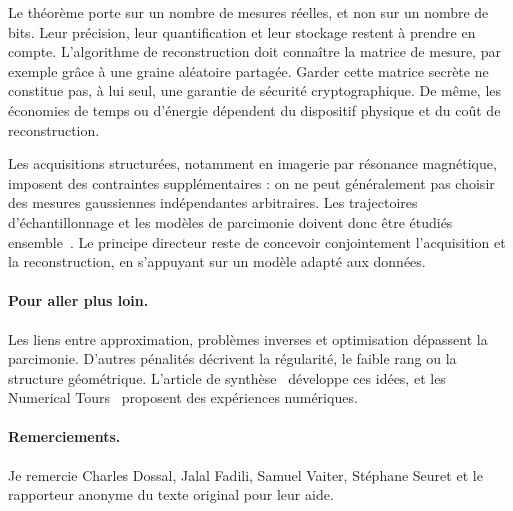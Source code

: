 Le théorème porte sur un nombre de mesures réelles, et non sur un nombre de bits. Leur précision, leur quantification et leur stockage restent à prendre en compte. L'algorithme de reconstruction doit connaître la matrice de mesure, par exemple grâce à une graine aléatoire partagée. Garder cette matrice secrète ne constitue pas, à lui seul, une garantie de sécurité cryptographique. De même, les économies de temps ou d'énergie dépendent du dispositif physique et du coût de reconstruction.

Les acquisitions structurées, notamment en imagerie par résonance magnétique, imposent des contraintes supplémentaires : on ne peut généralement pas choisir des mesures gaussiennes indépendantes arbitraires. Les trajectoires d'échantillonnage et les modèles de parcimonie doivent donc être étudiés ensemble~\cite{AdcockBreaking,Chauffert14}. Le principe directeur reste de concevoir conjointement l'acquisition et la reconstruction, en s'appuyant sur un modèle adapté aux données.

\paragraph*{Pour aller plus loin.}
Les liens entre approximation, problèmes inverses et optimisation dépassent la parcimonie. D'autres pénalités décrivent la régularité, le faible rang ou la structure géométrique. L'article de synthèse~\cite{2014-vaiter-ps-review} développe ces idées, et les Numerical Tours~\cite{2011-peyre-cise} proposent des expériences numériques.

\ifdefined\StandaloneChapter
\paragraph*{Remerciements.}
Je remercie Charles Dossal, Jalal Fadili, Samuel Vaiter, Stéphane Seuret et le rapporteur anonyme du texte original pour leur aide.
\fi
